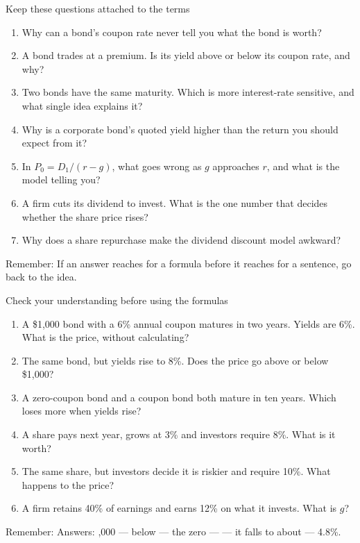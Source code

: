 \documentclass[10pt,aspectratio=169]{beamer}
\newcommand{\remember}[1]{\par\smallskip\alert{Remember:} #1}
\renewcommand{\pounds}{\ifmmode\text{\textsterling}\else\textsterling\fi}
\begin{document}
\begin{frame}{Keep these questions attached to the terms}
\begin{enumerate}
\item Why can a bond's coupon rate never tell you what the bond is worth?
\item A bond trades at a premium. Is its yield above or below its coupon rate, and why?
\item Two bonds have the same maturity. Which is more interest-rate sensitive, and what single idea explains it?
\item Why is a corporate bond's quoted yield higher than the return you should expect from it?
\item In $P_0=D_1/(r-g)$, what goes wrong as $g$ approaches $r$, and what is the model telling you?
\item A firm cuts its dividend to invest. What is the one number that decides whether the share price rises?
\item Why does a share repurchase make the dividend discount model awkward?
\end{enumerate}
\remember{If an answer reaches for a formula before it reaches for a sentence, go back to the idea.}
\end{frame}

\begin{frame}{Check your understanding before using the formulas}
\begin{enumerate}
\item A \$1,000 bond with a 6\% annual coupon matures in two years. Yields are 6\%. What is the price, without calculating?
\item The same bond, but yields rise to 8\%. Does the price go above or below \$1,000?
\item A zero-coupon bond and a coupon bond both mature in ten years. Which loses more when yields rise?
\item A share pays \pounds2 next year, grows at 3\% and investors require 8\%. What is it worth?
\item The same share, but investors decide it is riskier and require 10\%. What happens to the price?
\item A firm retains 40\% of earnings and earns 12\% on what it invests. What is $g$?
\end{enumerate}
\remember{Answers: \pounds1,000 --- below --- the zero --- \pounds40 --- it falls to about \pounds28.60 --- 4.8\%.}
\end{frame}
\end{document}
